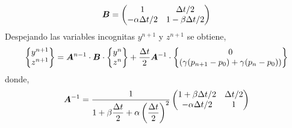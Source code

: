 \begin{equation}
\boldsymbol{B} = \begin{pmatrix}
1 & \Delta t / 2 \\
-\alpha \Delta t / 2 & 1-\beta \Delta t / 2
\end{pmatrix}
\end{equation}
Despejando las variables incognitas $y^{n+1}$ y $z^{n+1}$ se obtiene,
\begin{equation}
\begin{Bmatrix}
y^{n+1} \\ z^{n+1} 
\end{Bmatrix} =
\boldsymbol{A}^{n-1} \cdot \boldsymbol{B} \cdot 
\begin{Bmatrix}
y^n \\ z^n 
\end{Bmatrix} + \dfrac{\Delta t}{2} \boldsymbol{A}^{-1} \cdot
\begin{Bmatrix}
0 \\ \left( \gamma (p_{n+1}-p_0) + \gamma (p_{n}-p_0) \right)
\end{Bmatrix}
\end{equation}
donde,
\begin{equation}
\boldsymbol{A}^{-1} = \dfrac{1}{1 + \beta \dfrac{\Delta t}{2} + \alpha \left( \dfrac{\Delta t}{2} \right)^2 } 
\begin{pmatrix}
1 + \beta \Delta t / 2 & \Delta t / 2 \\
-\alpha \Delta t / 2 & 1 
\end{pmatrix}
\end{equation}

